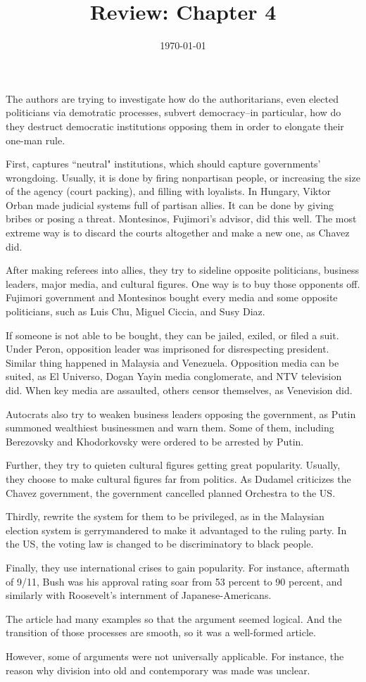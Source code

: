 \documentclass{homework}
\title{Review: Chapter 4}
\date{\today}
\begin{document}
\maketitle

The authors are trying to investigate how do the authoritarians, even elected politicians via demotratic processes, subvert democracy--in particular, how do they destruct democratic institutions opposing them in order to elongate their one-man rule.

First, captures ``neutral" institutions, which should capture governments' wrongdoing. Usually, it is done by firing nonpartisan people, or increasing the size of the agency (court packing), and filling with loyalists. In Hungary, Viktor Orban made judicial systems full of partisan allies. It can be done by giving bribes or posing a threat. Montesinos, Fujimori's advisor, did this well. The most extreme way is to discard the courts altogether and make a new one, as Chavez did.

After making referees into allies, they try to sideline opposite politicians, business leaders, major media, and cultural figures. One way is to buy those opponents off. Fujimori government and Montesinos bought every media and some opposite politicians, such as Luis Chu, Miguel Ciccia, and Susy Diaz.

If someone is not able to be bought, they can be jailed, exiled, or filed a suit. Under Peron, opposition leader was imprisoned for disrespecting president. Similar thing happened in Malaysia and Venezuela. Opposition media can be suited, as El Universo, Dogan Yayin media conglomerate, and NTV television did. When key media are assaulted, others censor themselves, as Venevision did.

Autocrats also try to weaken business leaders opposing the government, as Putin summoned wealthiest businessmen and warn them. Some of them, including Berezovsky and Khodorkovsky were ordered to be arrested by Putin.

Further, they try to quieten cultural figures getting great popularity. Usually, they choose to make cultural figures far from politics. As Dudamel criticizes the Chavez government, the government cancelled planned Orchestra to the US.

Thirdly, rewrite the system for them to be privileged, as in the Malaysian election system is gerrymandered to make it advantaged to the ruling party. In the US, the voting law is changed to be discriminatory to black people.

Finally, they use international crises to gain popularity. For instance, aftermath of 9/11, Bush was his approval rating soar from 53 percent to 90 percent, and similarly with Roosevelt's internment of Japanese-Americans.

The article had many examples so that the argument seemed logical. And the transition of those processes are smooth, so it was a well-formed article.

However, some of arguments were not universally applicable. For instance,  the reason why division into old and contemporary was made was unclear.
\end{document}

